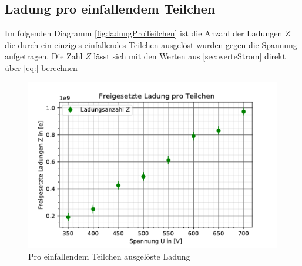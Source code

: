 \subsection{Ladung pro einfallendem Teilchen}
\label{sec:ladung}
Im folgenden Diagramm \autoref{fig:ladungProTeilchen} ist die Anzahl der Ladungen $Z$ die durch ein einziges einfallendes Teilchen ausgelöst
wurden gegen die Spannung aufgetragen. Die Zahl $Z$ lässt sich mit den Werten aus \autoref{sec:werteStrom} 
direkt über \autoref{eq:} berechnen
\begin{figure}
  \centering
  \includegraphics{ladungproteilchen.pdf}
  \caption{Pro einfallendem Teilchen ausgelöste Ladung}
  \label{fig:ladungProTeilchen}
\end{figure}
